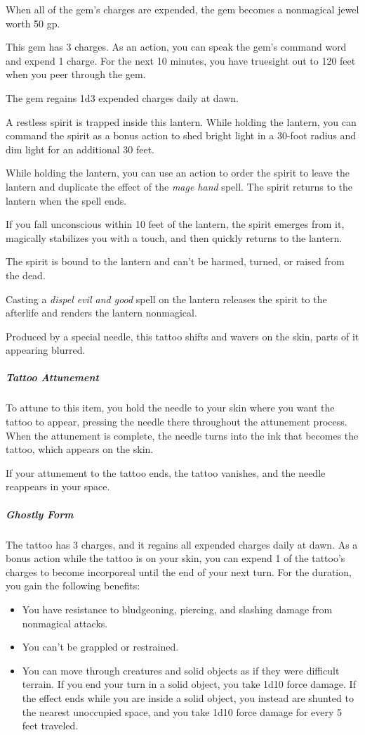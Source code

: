 \documentclass[10pt,a4paper,twoside,bg=print,twocolumn,openany,nodeprecatedcode]{dndbook}
\begin{document}
When all of the gem's charges are expended, the gem becomes a nonmagical jewel worth 50 gp.

This gem has 3 charges. As an action, you can speak the gem's command word and expend 1 charge. For the next 10 minutes, you have truesight out to 120 feet when you peer through the gem.

The gem regains 1d3 expended charges daily at dawn.

A restless spirit is trapped inside this lantern. While holding the lantern, you can command the spirit as a bonus action to shed bright light in a 30-foot radius and dim light for an additional 30 feet.

While holding the lantern, you can use an action to order the spirit to leave the lantern and duplicate the effect of the \textit{mage hand} spell. The spirit returns to the lantern when the spell ends.

If you fall unconscious within 10 feet of the lantern, the spirit emerges from it, magically stabilizes you with a touch, and then quickly returns to the lantern.

The spirit is bound to the lantern and can't be harmed, turned, or raised from the dead.

Casting a \textit{dispel evil and good} spell on the lantern releases the spirit to the afterlife and renders the lantern nonmagical.

Produced by a special needle, this tattoo shifts and wavers on the skin, parts of it appearing blurred.

\subparagraph{Tattoo Attunement}
To attune to this item, you hold the needle to your skin where you want the tattoo to appear, pressing the needle there throughout the attunement process. When the attunement is complete, the needle turns into the ink that becomes the tattoo, which appears on the skin.

If your attunement to the tattoo ends, the tattoo vanishes, and the needle reappears in your space.

\subparagraph{Ghostly Form}
The tattoo has 3 charges, and it regains all expended charges daily at dawn. As a bonus action while the tattoo is on your skin, you can expend 1 of the tattoo's charges to become incorporeal until the end of your next turn. For the duration, you gain the following benefits:


\begin{itemize}
\item You have resistance to bludgeoning, piercing, and slashing damage from nonmagical attacks.
\item You can't be grappled or restrained.
\item You can move through creatures and solid objects as if they were difficult terrain. If you end your turn in a solid object, you take 1d10 force damage. If the effect ends while you are inside a solid object, you instead are shunted to the nearest unoccupied space, and you take 1d10 force damage for every 5 feet traveled.
\end{itemize}
\end{document}
